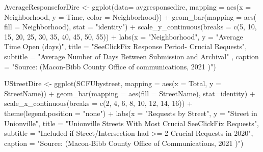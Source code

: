 \documentclass[
]{article}
\newenvironment{Shaded}{\begin{snugshade}}{\end{snugshade}}
\newcommand{\AttributeTok}[1]{\textcolor[rgb]{0.77,0.63,0.00}{#1}}
\newcommand{\DecValTok}[1]{\textcolor[rgb]{0.00,0.00,0.81}{#1}}
\newcommand{\FunctionTok}[1]{\textcolor[rgb]{0.00,0.00,0.00}{#1}}
\newcommand{\NormalTok}[1]{#1}
\newcommand{\OtherTok}[1]{\textcolor[rgb]{0.56,0.35,0.01}{#1}}
\newcommand{\SpecialCharTok}[1]{\textcolor[rgb]{0.00,0.00,0.00}{#1}}
\newcommand{\StringTok}[1]{\textcolor[rgb]{0.31,0.60,0.02}{#1}}
\begin{document}
\begin{Shaded}
\begin{Highlighting}[]
 
\NormalTok{ AverageResponseforDire }\OtherTok{\textless{}{-}} \FunctionTok{ggplot}\NormalTok{(}\AttributeTok{data=}\NormalTok{ avgresponsedire, }\AttributeTok{mapping =} \FunctionTok{aes}\NormalTok{(}\AttributeTok{x =}\NormalTok{ Neighborhood, }\AttributeTok{y =}\NormalTok{ Time, }\AttributeTok{color =}\NormalTok{ Neighborhood)) }\SpecialCharTok{+}
  \FunctionTok{geom\_bar}\NormalTok{(}\AttributeTok{mapping =} \FunctionTok{aes}\NormalTok{( }\AttributeTok{fill =}\NormalTok{ Neighborhood), }\AttributeTok{stat =} \StringTok{"identity"}\NormalTok{) }\SpecialCharTok{+} \FunctionTok{scale\_y\_continuous}\NormalTok{(}\AttributeTok{breaks =} \FunctionTok{c}\NormalTok{(}\DecValTok{5}\NormalTok{, }\DecValTok{10}\NormalTok{, }\DecValTok{15}\NormalTok{, }\DecValTok{20}\NormalTok{, }\DecValTok{25}\NormalTok{, }\DecValTok{30}\NormalTok{, }\DecValTok{35}\NormalTok{, }\DecValTok{40}\NormalTok{, }\DecValTok{45}\NormalTok{, }\DecValTok{50}\NormalTok{, }\DecValTok{55}\NormalTok{)) }\SpecialCharTok{+}
  \FunctionTok{labs}\NormalTok{(}\AttributeTok{x =} \StringTok{"Neighborhood"}\NormalTok{, }\AttributeTok{y =} \StringTok{"Average Time Open (days)"}\NormalTok{,}
     \AttributeTok{title =} \StringTok{"SeeClickFix Response Period{-} Crucial Requests"}\NormalTok{,}
     \AttributeTok{subtitle =} \StringTok{"Average Number of Days Between Submission and Archival"}\NormalTok{ ,}
     \AttributeTok{caption =} \StringTok{"Source: (Macon{-}Bibb County Office of communications, 2021 )"}\NormalTok{) }
 
  
\NormalTok{  UStreetDire }\OtherTok{\textless{}{-}} \FunctionTok{ggplot}\NormalTok{(SCFUbystreet, }\AttributeTok{mapping =} \FunctionTok{aes}\NormalTok{(}\AttributeTok{x =}\NormalTok{ Total, }\AttributeTok{y =}\NormalTok{ StreetName)) }\SpecialCharTok{+} \FunctionTok{geom\_bar}\NormalTok{(}\AttributeTok{mapping =} \FunctionTok{aes}\NormalTok{(}\AttributeTok{fill =}\NormalTok{ StreetName), }\AttributeTok{stat=}\StringTok{\textquotesingle{}identity\textquotesingle{}}\NormalTok{)  }\SpecialCharTok{+} \FunctionTok{scale\_x\_continuous}\NormalTok{(}\AttributeTok{breaks =} \FunctionTok{c}\NormalTok{(}\DecValTok{2}\NormalTok{, }\DecValTok{4}\NormalTok{, }\DecValTok{6}\NormalTok{, }\DecValTok{8}\NormalTok{, }\DecValTok{10}\NormalTok{, }\DecValTok{12}\NormalTok{, }\DecValTok{14}\NormalTok{, }\DecValTok{16}\NormalTok{)) }\SpecialCharTok{+}
   \FunctionTok{theme}\NormalTok{(}\AttributeTok{legend.position =} \StringTok{"none"}\NormalTok{) }\SpecialCharTok{+}
  \FunctionTok{labs}\NormalTok{(}\AttributeTok{x =} \StringTok{"Requests by Street"}\NormalTok{, }\AttributeTok{y =} \StringTok{"Street in Unionville"}\NormalTok{,}
     \AttributeTok{title =} \StringTok{"Unionville Streets With Most \textquotesingle{}Crucial\textquotesingle{} SeeClickFix Requests"}\NormalTok{,}
     \AttributeTok{subtitle =} \StringTok{"Included if Street/Intersection had \textgreater{}= 2 Crucial Requests in 2020"}\NormalTok{,}
     \AttributeTok{caption =} \StringTok{"Source: (Macon{-}Bibb County Office of Communications, 2021 )"}\NormalTok{) }
\end{Highlighting}
\end{Shaded}
\end{document}
